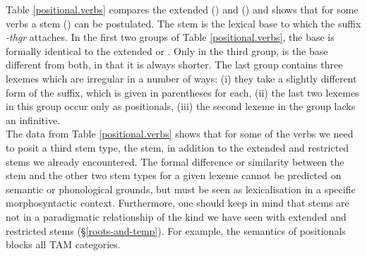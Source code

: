 Table \ref{positional.verbs} compares the extended (\Ext) and  (\Rs) and shows that for some verbs a  stem (\Pos) can be postulated. The  stem is the lexical base to which the  suffix \emph{-thgr} attaches. In the first two groups of Table \ref{positional.verbs}, the base is formally identical to the extended or . Only in the third group, is the base different from both, in that it is always shorter. The last group contains three lexemes which are irregular in a number of ways: (i) they take a slightly different form of the  suffix, which is given in parentheses for each, (ii) the last two lexemes in this group occur only as positionals, (iii) the second lexeme in the group lacks an infinitive.\\

The data from Table \ref{positional.verbs} shows that for some of the verbs we need to posit a third stem type, the  stem, in addition to the extended and restricted stems we already encountered. The formal difference or similarity between the  stem and the other two stem types for a given lexeme cannot be predicted on semantic or phonological grounds, but must be seen as lexicalisation in a specific morphosyntactic context. Furthermore, one should keep in mind that  stems are not in a paradigmatic relationship of the kind we have seen with extended and restricted stems (\S{}\ref{roots-and-temp}). For example, the  semantics of positionals blocks all  TAM categories.


